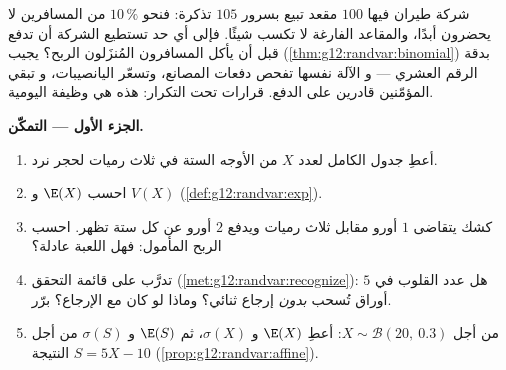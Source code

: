 \begin{problem}
\label{pb:g12:randvar:1}
شركة طيران فيها $100$ مقعد تبيع بسرور $105$ تذكرة: فنحو
$10\,\%$ من المسافرين لا يحضرون أبدًا، والمقاعد الفارغة لا تكسب
شيئًا. فإلى أي حد تستطيع الشركة أن تدفع قبل أن يأكل المسافرون المُنزَلون
الربح؟ يجيب 
(\cref{thm:g12:randvar:binomial}) بدقة الرقم العشري --- و
الآلة نفسها تفحص دفعات المصانع، وتسعّر اليانصيبات، و
تبقي المؤمّنين قادرين على الدفع. قرارات تحت التكرار: هذه هي
وظيفة  اليومية.

\medskip
\noindent\textbf{الجزء الأول --- التمكّن.}
\begin{enumerate}
  \item أعطِ جدول  الكامل لعدد $X$ من
        الأوجه الستة في ثلاث رميات لحجر نرد.
  \item احسب $\E(X)$ و $V(X)$
        (\cref{def:g12:randvar:exp}).
  \item كشك يتقاضى $1$ أورو مقابل ثلاث رميات ويدفع $2$
        أورو عن كل ستة تظهر. احسب الربح المأمول: فهل اللعبة
        عادلة؟
  \item تدرَّب على قائمة التحقق (\cref{met:g12:randvar:recognize}):
        هل عدد القلوب في $5$ أوراق تُسحب
        \emph{بدون} إرجاع ثنائي؟ وماذا لو كان مع الإرجاع؟
        برّر.
  \item من أجل $X \sim \mathcal B(20,\ 0.3)$: أعطِ $\E(X)$ و
        $\sigma(X)$، ثم $\E(S)$ و $\sigma(S)$ من أجل النتيجة
        $S = 5X - 10$ (\cref{prop:g12:randvar:affine}).
\end{enumerate}


\end{problem}
